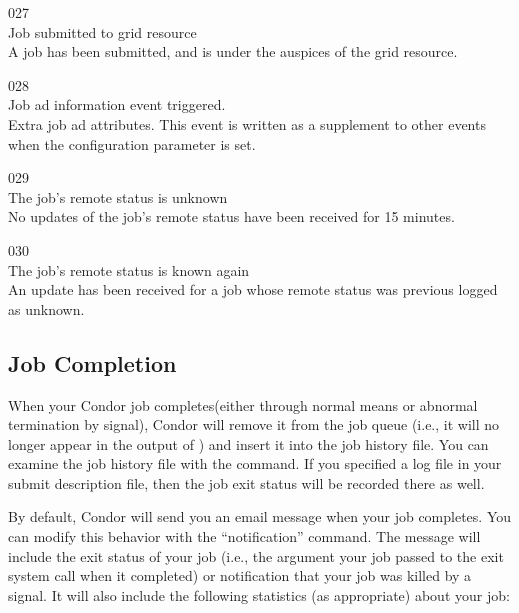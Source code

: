 \noindent{} 027 \\
 Job submitted to grid resource \\
 A job has been submitted,
and is under the auspices of the grid resource.

\noindent{} 028 \\
 Job ad information event triggered. \\
 Extra job ad attributes. This event is
written as a supplement to other events when the configuration
parameter  is set.

\noindent{} 029 \\
 The job's remote status is unknown \\
 No updates of the job's remote status
have been received for 15 minutes.

\noindent{} 030 \\
 The job's remote status is known again \\
 An update has been received for a job whose
remote status was previous logged as unknown.

\subsection{\label{sec:job-completion}Job Completion}

When your Condor job completes(either through normal means or abnormal
termination by signal), Condor will remove it from the job queue (i.e.,
it will no longer appear in the output of ) and insert it into
the job history file.  You can examine the job history file with the
 command. If you specified a log file in your submit
description file, then the job exit status will be recorded there as well.

By default, Condor will send you an email message
when your job completes.  You can modify this behavior with the
 ``notification'' command.
The message will include the exit status of your job (i.e., the
argument your job passed to the exit system call when it completed) or
notification that your job was killed by a signal.  It will also
include the following statistics (as appropriate) about your job:


